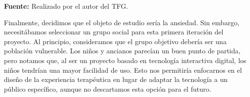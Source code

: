 \begin{table}[h!]
	\centering
		\caption{Comparación de emociones limitantes contra sus respectivas potenciadoras.}
		\label{tab:Emotions}
		\vspace{-30pt}
\end{table}

\begin{center}
	\textbf{Fuente:} Realizado por el autor del TFG.	
\end{center}

Finalmente, decidimos que el objeto de estudio sería la ansiedad. Sin embargo, necesitábamos seleccionar un grupo social para esta primera iteración del proyecto. Al principio, consideramos que el grupo objetivo debería ser una población vulnerable. Los niños y ancianos parecían un buen punto de partida, pero notamos que, al ser un proyecto basado en tecnología interactiva digital, los niños tendrían una mayor facilidad de uso. Esto nos permitiría enfocarnos en el diseño de la experiencia terapéutica en lugar de adaptar la tecnología a un público específico, aunque no descartamos esta opción para el futuro. 

